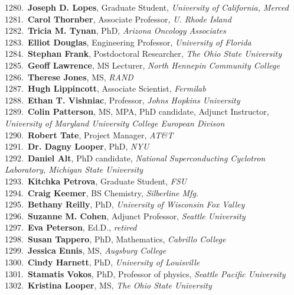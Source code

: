 1280.~{\bf Joseph D. Lopes}, Graduate Student, {\sl University of California, Merced} \\
1281.~{\bf Carol Thornber}, Associate Professor, {\sl U. Rhode Island} \\
1282.~{\bf Tricia M. Tynan}, PhD, {\sl Arizona Oncology Associates} \\
1283.~{\bf Elliot Douglas}, Engineering Professor, {\sl University of Florida} \\
1284.~{\bf Stephan Frank}, Postdoctoral Researcher, {\sl The Ohio State University} \\
1285.~{\bf Geoff Lawrence}, MS Lecturer, {\sl North Hennepin Community College} \\
1286.~{\bf Therese Jones}, MS, {\sl RAND} \\
1287.~{\bf Hugh Lippincott}, Associate Scientist, {\sl Fermilab} \\
1288.~{\bf Ethan T. Vishniac}, Professor, {\sl Johns Hopkins University} \\
1289.~{\bf Colin Patterson}, MS, MPA, PhD candidate, Adjunct Instructor, {\sl University of Maryland University College European Divison} \\
1290.~{\bf Robert Tate}, Project Manager, {\sl AT\&T} \\
1291.~{\bf Dr. Dagny Looper}, PhD, {\sl NYU} \\
1292.~{\bf Daniel Alt}, PhD candidate, {\sl National Superconducting Cyclotron Laboratory, Michigan State University} \\
1293.~{\bf Kitchka Petrova}, Graduate Student, {\sl FSU} \\
1294.~{\bf Craig Keemer}, BS Chemistry, {\sl Silberline Mfg.} \\
1295.~{\bf Bethany Reilly}, PhD, {\sl University of Wisconsin Fox Valley} \\
1296.~{\bf Suzanne M. Cohen}, Adjunct Professor, {\sl Seattle University} \\
1297.~{\bf Eva Peterson}, Ed.D., {\sl retired} \\
1298.~{\bf Susan Tappero}, PhD, Mathematics, {\sl Cabrillo College} \\
1299.~{\bf Jessica Ennis}, MS, {\sl Augsburg College} \\
1300.~{\bf Cindy Harnett}, PhD, {\sl University of Louisville} \\
1301.~{\bf Stamatis Vokos}, PhD, Professor of physics, {\sl Seattle Pacific University} \\
1302.~{\bf Kristina Looper}, MS, {\sl The Ohio State University} \\
